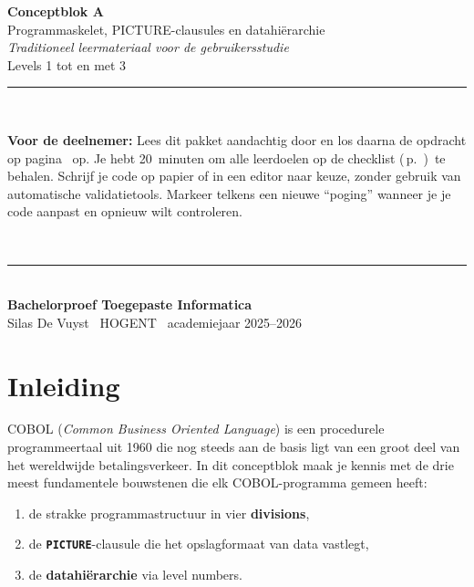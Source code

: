 \documentclass[11pt,a4paper]{article}
\begin{document}
\begin{titlepage}
\begin{center}
\vspace*{2cm}
{\Huge\bfseries Conceptblok A}\\[0.5cm]
{\Large Programmaskelet, PICTURE-clausules en datahiërarchie}\\[2cm]

{\large \textit{Traditioneel leermateriaal voor de gebruikersstudie}}\\[0.3cm]
{\large Levels 1 tot en met 3}\\[3cm]

\rule{\textwidth}{0.4pt}\\[0.5cm]
\begin{minipage}{0.9\textwidth}
\textbf{Voor de deelnemer:}
Lees dit pakket aandachtig door en los daarna de opdracht op pagina~\pageref{sec:opdracht-A} op. 
Je hebt 20~minuten om alle leerdoelen op de checklist (\,p.~\pageref{sec:rubric-A})\, te behalen. 
Schrijf je code op papier of in een editor naar keuze, zonder gebruik van automatische validatietools. 
Markeer telkens een nieuwe ``poging'' wanneer je je code aanpast en opnieuw wilt controleren.
\end{minipage}\\
\rule{\textwidth}{0.4pt}\\[1cm]

\vfill
\textbf{Bachelorproef Toegepaste Informatica} \\
Silas De Vuyst \textbullet\ HOGENT \textbullet\ academiejaar 2025--2026
\end{center}
\end{titlepage}

\section{Inleiding}

COBOL (\textit{Common Business Oriented Language}) is een procedurele programmeertaal uit 1960 die nog steeds aan de basis ligt van een groot deel van het wereldwijde betalings\-verkeer. 
In dit conceptblok maak je kennis met de drie meest fundamentele bouwstenen die elk COBOL-programma gemeen heeft:

\begin{enumerate}[label=(\arabic*)]
    \item de strakke programmastructuur in vier \textbf{divisions},
    \item de \textbf{\texttt{PICTURE}}-clausule die het opslagformaat van data vastlegt,
    \item de \textbf{datahiërarchie} via level numbers.
\end{enumerate}
\end{document}
